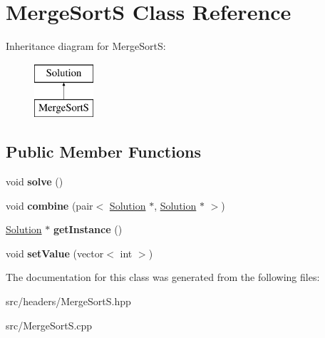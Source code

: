 \hypertarget{classMergeSortS}{\section{Merge\-Sort\-S Class Reference}
\label{classMergeSortS}
}
Inheritance diagram for Merge\-Sort\-S\-:\begin{figure}[H]
\begin{center}
\leavevmode
\includegraphics[height=2.000000cm]{classMergeSortS}
\end{center}
\end{figure}
\subsection*{Public Member Functions}
\begin{DoxyCompactItemize}
\item 
\hypertarget{classMergeSortS_a0609d7b00651a4fdd4aa60678e2c07d5}{void {\bfseries solve} ()}\label{classMergeSortS_a0609d7b00651a4fdd4aa60678e2c07d5}

\item 
\hypertarget{classMergeSortS_aad9bbe320dac4eedfa3fa0a435670b50}{void {\bfseries combine} (pair$<$ \hyperlink{classSolution}{Solution} $\ast$, \hyperlink{classSolution}{Solution} $\ast$ $>$)}\label{classMergeSortS_aad9bbe320dac4eedfa3fa0a435670b50}

\item 
\hypertarget{classMergeSortS_a6e8f5575eb38fe2eb3e57138b4fd47f5}{\hyperlink{classSolution}{Solution} $\ast$ {\bfseries get\-Instance} ()}\label{classMergeSortS_a6e8f5575eb38fe2eb3e57138b4fd47f5}

\item 
\hypertarget{classMergeSortS_a25499fb864f86ad8953a7dbef4fcf76e}{void {\bfseries set\-Value} (vector$<$ int $>$)}\label{classMergeSortS_a25499fb864f86ad8953a7dbef4fcf76e}

\end{DoxyCompactItemize}


The documentation for this class was generated from the following files\-:\begin{DoxyCompactItemize}
\item 
src/headers/Merge\-Sort\-S.\-hpp\item 
src/Merge\-Sort\-S.\-cpp\end{DoxyCompactItemize}
